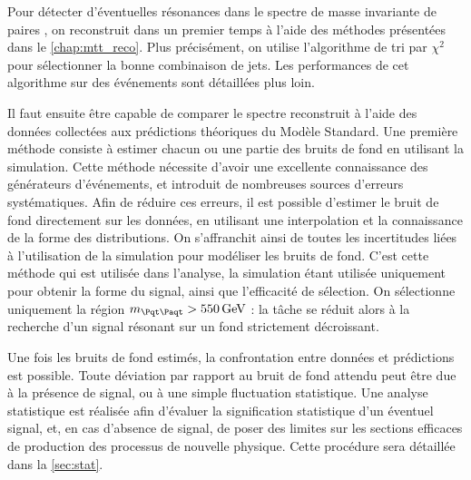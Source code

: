 Pour détecter d'éventuelles résonances dans le spectre de masse invariante de paires \ttbar, on reconstruit dans un premier temps \mtt à l'aide des méthodes présentées dans le \cref{chap:mtt_reco}. Plus précisément, on utilise l'algorithme de tri par $\chi^2$ pour sélectionner la bonne combinaison de jets. Les performances de cet algorithme sur des événements \zprime sont détaillées plus loin.

\smallskip

Il faut ensuite être capable de comparer le spectre \mtt reconstruit à l'aide des données collectées aux prédictions théoriques du Modèle Standard. Une première méthode consiste à estimer chacun ou une partie des bruits de fond en utilisant la simulation. Cette méthode nécessite d'avoir une excellente connaissance des générateurs d'événements, et introduit de nombreuses sources d'erreurs systématiques. Afin de réduire ces erreurs, il est possible d'estimer le bruit de fond directement sur les données, en utilisant une interpolation et la connaissance de la forme des distributions. On s'affranchit ainsi de toutes les incertitudes liées à l'utilisation de la simulation pour modéliser les bruits de fond. C'est cette méthode qui est utilisée dans l'analyse, la simulation étant utilisée uniquement pour obtenir la forme du signal, ainsi que l'efficacité de sélection. On sélectionne uniquement la région $\mtt > \SI{550}{\GeV}$ : la tâche se réduit alors à la recherche d'un signal résonant sur un fond strictement décroissant.

\smallskip

Une fois les bruits de fond estimés, la confrontation entre données et prédictions est possible. Toute déviation par rapport au bruit de fond attendu peut être due à la présence de signal, ou à une simple fluctuation statistique. Une analyse statistique est réalisée afin d'évaluer la signification statistique d'un éventuel signal, et, en cas d'absence de signal, de poser des limites sur les sections efficaces de production des processus de nouvelle physique. Cette procédure sera détaillée dans la \cref{sec:stat}.


